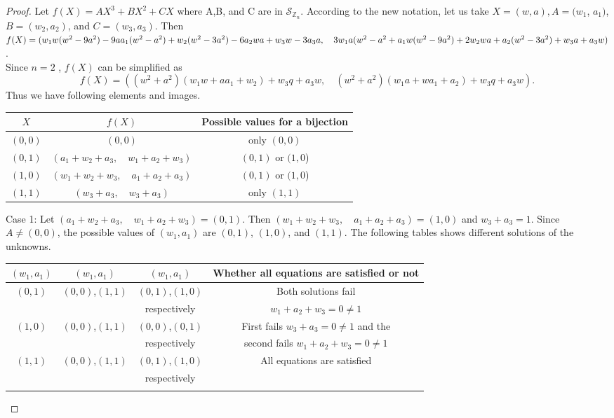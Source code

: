 \documentclass[sn-mathphys,Numbered]{sn-jnl}%
\theoremstyle{thmstyleone}
\theoremstyle{thmstyletwo}
\theoremstyle{thmstylethree}
\begin{document}
\begin{proof}
Let $f(X)=AX^{3}+BX^{2}+CX$ where A,B, and C are in $\mathcal{S}_{\mathbb{Z}_{n}}$. According to the new notation, let us take $X=(w,a),A=(w_{1}$, $a_{1})$, $B=(w_{2},a_{2})$, and $C=(w_{3},a_{3})$. Then $f(X)=(w_{1}w(w^{2}-9a^{2})-9aa_{1}(w^{2}-a^{2})+w_{2}(w^{2}-3a^{2})-6a_{2}wa+w_{3}w-3a_{3}a, \\ \quad 3w_{1}a(w^{2}-a^{2}+a_{1}w(w^{2}-9a^{2})+2w_{2}wa+a_{2}(w^{2}-3a^{2})+w_{3}a+a_{3}w)$. \\ Since $n=2$ , $f(X)$ can be simplified as $$f(X)=((w^{2}+a^{2})(w_{1}w+aa_{1}+w_{2})+w_{3}q+a_{3}w, \quad (w^{2}+a^{2})(w_{1}a+wa_{1}+a_{2})+w_{3}q+a_{3}w).$$ Thus we have following elements and images. \\
\begin{tabular}{|c|c|c|}
  \hline
  $X$ & $f(X)$ & Possible values 
                              for a bijection \\ \hline
  $(0,0)$ & $(0,0)$ &only $(0,0)$ \\ \hline
 $(0,1)$ & $(a_{1}+w_{2}+a_{3}, \quad w_{1}+a_{2}+w_{3})$ & $(0,1)$ or $(1,0$)\\ \hline
 $(1,0)$ & $(w_{1}+w_{2}+w_{3}, \quad a_{1}+a_{2}+a_{3})$ &  $(0,1)$ or $(1,0$)\\ \hline
  $(1,1)$ & $(w_{3}+a_{3}, \quad w_{3}+a_{3})$  & only $(1,1)$\\
  \hline 
\end{tabular}
\vspace{0.5cm}

\noindent
Case 1: Let $(a_{1}+w_{2}+a_{3}, \quad w_{1}+a_{2}+w_{3})=(0,1)$. Then $(w_{1}+w_{2}+w_{3}, \quad a_{1}+a_{2}+a_{3})=(1,0)$ and $w_{3}+a_{3}=1$. Since $A \neq (0,0)$, the possible values of $(w_{1},a_{1})$ are  $(0,1)$,  $(1,0)$, and $(1,1)$. The following tables shows different solutions of the unknowns.
\begin{tabular}{|c|c|c|c|}
  \hline
 $(w_{1},a_{1})$ & $(w_{1},a_{1})$ & $(w_{1},a_{1})$ & Whether all equations are satisfied or not \\ \hline
  $(0,1)$ & $(0,0)$,$(1,1)$ & $(0,1)$,$(1,0)$  & Both solutions fail \\
 & & respectively& $w_{1}+a_{2}+w_{3}=0\neq 1$ \\ \hline
  $(1,0)$ &$(0,0)$,$(1,1)$ & $(0,0)$,$(0,1)$  &  First fails $w_{3}+a_{3}=0\neq 1$ and the \\ 
  & &respectively & second fails $w_{1}+a_{2}+w_{3}=0\neq 1$\\ \hline
 $(1,1)$ & $(0,0)$,$(1,1)$ & $(0,1)$,$(1,0)$  & All equations are satisfied \\
 & & respectively &  \\ \\ \hline
\end{tabular}


\end{proof}
\end{document}
